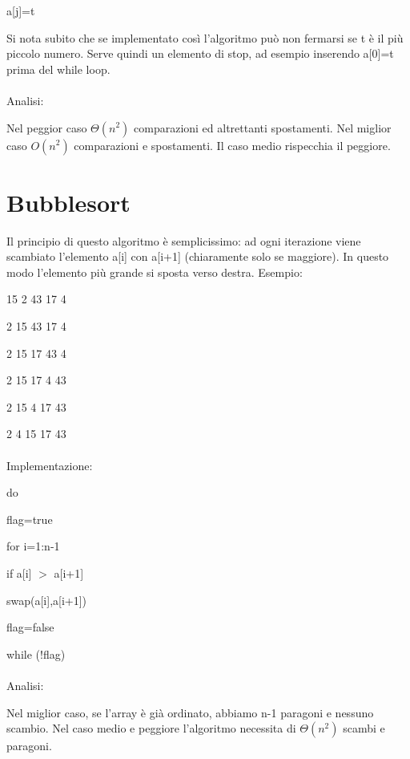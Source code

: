 \documentclass[12pt,a4paper]{book}
\begin{document}
\hspace{2em} a[j]=t

Si nota subito che se implementato così l'algoritmo può non fermarsi se t è il più piccolo numero. Serve quindi un elemento di stop, ad esempio inserendo a[0]=t prima del while loop.

\paragraph{}
Analisi:

Nel peggior caso $\Theta (n^2)$ comparazioni ed altrettanti spostamenti. Nel miglior caso $O(n^2)$ comparazioni e spostamenti. Il caso medio rispecchia il peggiore.

\section{Bubblesort}
Il principio di questo algoritmo è semplicissimo: ad ogni iterazione viene scambiato l'elemento a[i] con a[i+1] (chiaramente solo se maggiore). In questo modo l'elemento più grande si sposta verso destra. Esempio:

15 2 43 17 4

2 15 43 17 4

2 15 17 43 4

2 15 17 4 43

2 15 4 17 43

2 4 15 17 43

\paragraph{}Implementazione:

do

\hspace{2em} flag=true

\hspace{2em} for i=1:n-1

\hspace{2em} if a[i] $>$ a[i+1] 

\hspace{2em} \hspace{2em} swap(a[i],a[i+1])

\hspace{2em} \hspace{2em} flag=false

while (!flag)

\paragraph{}Analisi:

Nel miglior caso, se l'array è già ordinato, abbiamo n-1 paragoni e nessuno scambio. Nel caso medio e peggiore l'algoritmo necessita di $\Theta (n^2)$ scambi e paragoni.
\end{document}
